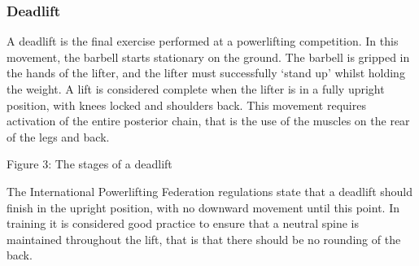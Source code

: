\subsubsection{Deadlift}

A deadlift is the final exercise performed at a powerlifting competition. In this movement, the barbell starts stationary on the ground. The barbell is gripped in the hands of the lifter, and the lifter must successfully ‘stand up’ whilst holding the weight. A lift is considered complete when the lifter is in a fully upright position, with knees locked and shoulders back. This movement requires activation of the entire posterior chain, that is the use of the muscles on the rear of the legs and back.

Figure 3: The stages of a deadlift

The International Powerlifting Federation regulations\cite{ipf} state that a deadlift should finish in the upright position, with no downward movement until this point. In training it is considered good practice to ensure that a neutral spine is maintained throughout the lift, that is that there should be no rounding of the back.